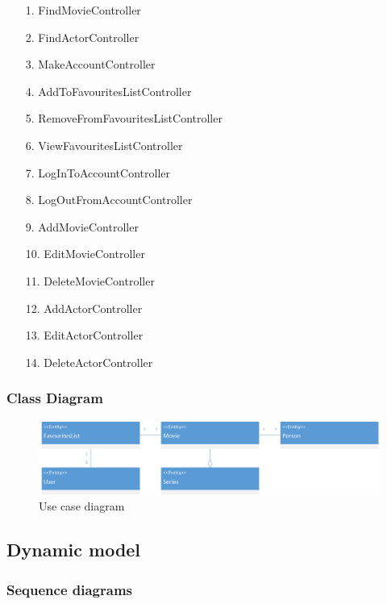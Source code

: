 \begin{enumerate}
	\item[1.] FindMovieController
	\item[2.] FindActorController
	\item[3.] MakeAccountController 
	\item[4.] AddToFavouritesListController
	\item[5.] RemoveFromFavouritesListController
	\item[6.] ViewFavouritesListController
	\item[7.] LogInToAccountController
	\item[8.] LogOutFromAccountController 
	
	\item[9.] AddMovieController
 	\item[10.] EditMovieController
 	\item[11.] DeleteMovieController
 	\item[12.] AddActorController
 	\item[13.] EditActorController
 	\item[14.] DeleteActorController
 	
\end{enumerate}

\subsubsection{Class Diagram}

\begin{figure}[H]
\includegraphics[width=\linewidth]{img/ClassDiagram.png}
\caption{Use case diagram}
\label{fig:use case diagram}
\end{figure}

\subsection{Dynamic model}



\subsubsection{Sequence diagrams}



